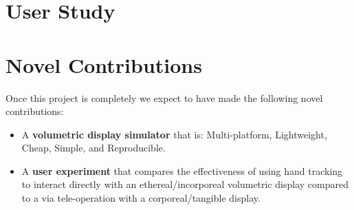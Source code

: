 \section{User Study}
\todo

\section{Novel Contributions}
Once this project is completely we expect to have made the following novel contributions:
\begin{itemize}
    \item A \textbf{volumetric display simulator} that is: Multi-platform, Lightweight, Cheap, Simple, and Reproducible.
    \item A \textbf{user experiment} that compares the effectiveness of using hand tracking to interact directly with an ethereal/incorporeal volumetric display compared to a via tele-operation with a corporeal/tangible display.
\end{itemize}